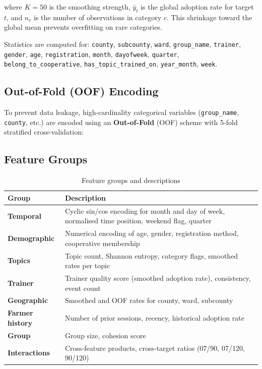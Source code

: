 \documentclass[12pt,a4paper]{article}
\begin{document}
where $K = 50$ is the smoothing strength, $\bar{y}_t$ is the global adoption rate for target $t$, and $n_c$ is the number of observations in category $c$. This shrinkage toward the global mean prevents overfitting on rare categories.

Statistics are computed for: \texttt{county}, \texttt{subcounty}, \texttt{ward}, \texttt{group\_name}, \texttt{trainer}, \texttt{gender}, \texttt{age}, \texttt{registration}, \texttt{month}, \texttt{dayofweek}, \texttt{quarter}, \texttt{belong\_to\_cooperative}, \texttt{has\_topic\_trained\_on}, \texttt{year\_month}, \texttt{week}.

\subsection{Out-of-Fold (OOF) Encoding}

To prevent data leakage, high-cardinality categorical variables (\texttt{group\_name}, \texttt{county}, etc.) are encoded using an \textbf{Out-of-Fold} (OOF) scheme with 5-fold stratified cross-validation:


\subsection{Feature Groups}

\begin{table}[H]
\centering
\caption{Feature groups and descriptions}
\renewcommand{\arraystretch}{1.3}
\begin{tabular}{lp{9cm}}
\toprule
\textbf{Group} & \textbf{Description} \\
\midrule
\textbf{Temporal} & Cyclic sin/cos encoding for month and day of week, normalised time position, weekend flag, quarter \\
\textbf{Demographic} & Numerical encoding of age, gender, registration method, cooperative membership \\
\textbf{Topics} & Topic count, Shannon entropy, category flags, smoothed rates per topic \\
\textbf{Trainer} & Trainer quality score (smoothed adoption rate), consistency, event count \\
\textbf{Geographic} & Smoothed and OOF rates for county, ward, subcounty \\
\textbf{Farmer history} & Number of prior sessions, recency, historical adoption rate \\
\textbf{Group} & Group size, cohesion score \\
\textbf{Interactions} & Cross-feature products, cross-target ratios (07/90, 07/120, 90/120) \\
\bottomrule
\end{tabular}
\end{table}
\end{document}
